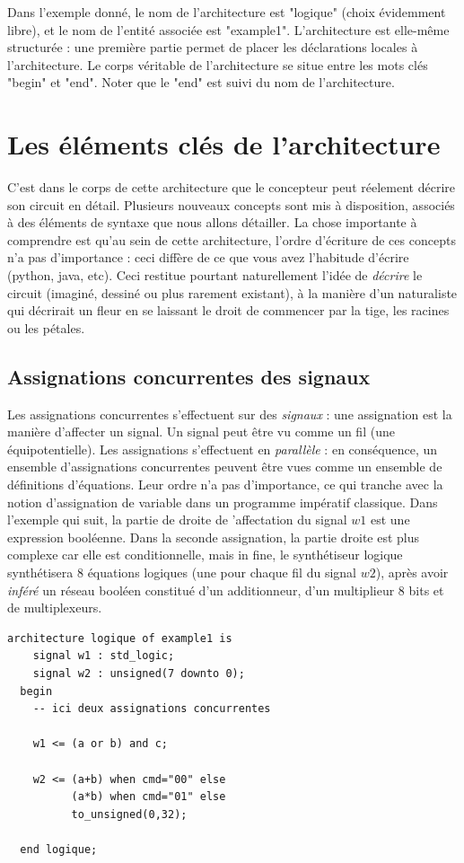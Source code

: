 Dans l'exemple donné, le nom de l'architecture est "logique" (choix évidemment libre), et le nom de l'entité associée est "example1".
L'architecture est elle-même structurée : une première partie permet de placer les déclarations locales à l'architecture. Le corps véritable de l'architecture se
situe entre les mots clés "begin" et "end". Noter que le "end" est suivi du nom de l'architecture.

\section{Les éléments clés de l'architecture}
C'est dans le corps de cette architecture que le concepteur peut réelement décrire son circuit en détail. Plusieurs nouveaux concepts sont mis à disposition, associés
à des éléments de syntaxe que nous allons détailler. La chose importante à comprendre est qu'au sein de cette architecture, l'ordre d'écriture de ces concepts
n'a pas d'importance : ceci diffère de ce que vous avez l'habitude d'écrire (python, java, etc). Ceci restitue pourtant naturellement l'idée de {\it décrire} le circuit
(imaginé, dessiné ou plus rarement existant), à la manière d'un naturaliste qui décrirait un fleur en se laissant le droit de commencer par la tige, les racines ou les pétales.
\subsection{Assignations concurrentes des signaux}

Les assignations concurrentes s'effectuent sur des {\it signaux} : une assignation est la manière d'affecter un signal. Un signal peut être vu comme un fil (une équipotentielle).
Les assignations s'effectuent en {\it parallèle} : en conséquence, un ensemble d'assignations concurrentes peuvent être vues comme un ensemble de définitions d'équations. Leur ordre n'a pas d'importance, ce qui
tranche avec la notion d'assignation de variable dans un programme impératif classique. Dans l'exemple
qui suit, la partie de droite de 'affectation du signal $w1$ est une expression booléenne. Dans la seconde assignation, la partie droite est plus complexe car elle est conditionnelle, mais in fine,
le synthétiseur logique synthétisera 8 équations logiques (une pour chaque fil du signal $w2$), après avoir {\it inféré} un réseau booléen constitué d'un additionneur, d'un multiplieur 8 bits et de multiplexeurs.

\begin{lstlisting}[frame=single]
  architecture logique of example1 is
    signal w1 : std_logic;
    signal w2 : unsigned(7 downto 0);
  begin
    -- ici deux assignations concurrentes

    w1 <= (a or b) and c;

    w2 <= (a+b) when cmd="00" else
          (a*b) when cmd="01" else
          to_unsigned(0,32);

  end logique;
\end{lstlisting}

